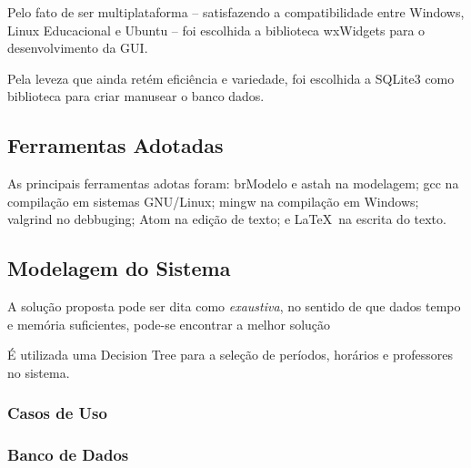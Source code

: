 \documentclass[12pt,a4paper]{article}
\begin{document}
			\par Pelo fato de ser multiplataforma -- satisfazendo a compatibilidade entre Windows, Linux Educacional e Ubuntu -- foi escolhida a biblioteca wxWidgets para o desenvolvimento da GUI.

			\par Pela leveza que ainda retém eficiência e variedade, foi escolhida a SQLite3 como biblioteca para criar manusear o banco dados.

		\subsection{Ferramentas Adotadas}

			\par As principais ferramentas adotas foram: brModelo e astah na modelagem; gcc na compilação em sistemas GNU/Linux; mingw na compilação em Windows; valgrind no debbuging; Atom na edição de texto; e \LaTeX \, na escrita do texto.

		\subsection{Modelagem do Sistema}

			A solução proposta pode ser dita como \textit{exaustiva}, no sentido de que dados tempo e memória suficientes, pode-se encontrar a melhor solução

			É utilizada uma Decision Tree para a seleção de períodos, horários e professores no sistema.

			\lipsum[1]


			\subsubsection{Casos de Uso}

				\lipsum[1]

			\subsubsection{Banco de Dados}
\end{document}
